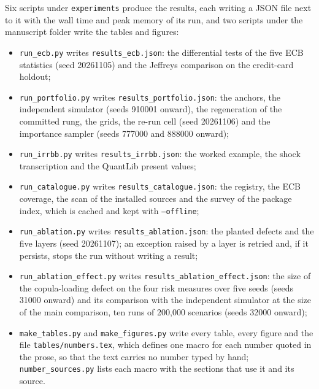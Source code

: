 Six scripts under \texttt{experiments} produce the results, each writing a JSON file next to it with the wall time and peak memory of its run, and two scripts under the manuscript folder write the tables and figures:
\begin{itemize}
\item \texttt{run\_ecb.py} writes \texttt{results\_ecb.json}: the differential tests of the five ECB statistics (seed 20261105) and the Jeffreys comparison on the credit-card holdout;
\item \texttt{run\_portfolio.py} writes \texttt{results\_portfolio.json}: the anchors, the independent simulator (seeds 910001 onward), the regeneration of the committed rung, the grids, the re-run cell (seed 20261106) and the importance sampler (seeds 777000 and 888000 onward);
\item \texttt{run\_irrbb.py} writes \texttt{results\_irrbb.json}: the worked example, the shock transcription and the QuantLib present values;
\item \texttt{run\_catalogue.py} writes \texttt{results\_catalogue.json}: the registry, the ECB coverage, the scan of the installed sources and the survey of the package index, which is cached and kept with \texttt{--offline};
\item \texttt{run\_ablation.py} writes \texttt{results\_ablation.json}: the planted defects and the five layers (seed 20261107); an exception raised by a layer is retried and, if it persists, stops the run without writing a result;
\item \texttt{run\_ablation\_effect.py} writes \texttt{results\_ablation\_effect.json}: the size of the copula-loading defect on the four risk measures over five seeds (seeds 31000 onward) and its comparison with the independent simulator at the size of the main comparison, ten runs of 200,000 scenarios (seeds 32000 onward);
\item \texttt{make\_tables.py} and \texttt{make\_figures.py} write every table, every figure and the file \texttt{tables/numbers.tex}, which defines one macro for each number quoted in the prose, so that the text carries no number typed by hand; \texttt{number\_sources.py} lists each macro with the sections that use it and its source.
\end{itemize}


